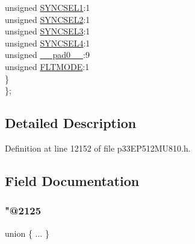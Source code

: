 \begin{DoxyCompactItemize}
\begin{tabbing}
\>\>unsigned \hyperlink{structtag_o_c15_c_o_n2_b_i_t_s_a50e73f95ab1c258ddc64f69c0991deaf}{SYNCSEL1}:1\\
\>\>unsigned \hyperlink{structtag_o_c15_c_o_n2_b_i_t_s_a304907a5d2c4cbf1114a54642a85951e}{SYNCSEL2}:1\\
\>\>unsigned \hyperlink{structtag_o_c15_c_o_n2_b_i_t_s_a6bbd1bd2ead6c9fa713969c6eb0f0c75}{SYNCSEL3}:1\\
\>\>unsigned \hyperlink{structtag_o_c15_c_o_n2_b_i_t_s_a0cd5bbe196c7974953909d27a6307bb7}{SYNCSEL4}:1\\
\>\>unsigned \hyperlink{structtag_o_c15_c_o_n2_b_i_t_s_adf71f3d8410c1f1dbbc96680a92c49af}{\_\_pad0\_\_}:9\\
\>\>unsigned \hyperlink{structtag_o_c15_c_o_n2_b_i_t_s_ad53c2a5303780172219bfd5e0100c782}{FLTMODE}:1\\
\>\} \\
\}; \\

\end{tabbing}\end{DoxyCompactItemize}


\subsection{Detailed Description}


Definition at line 12152 of file p33\+E\+P512\+M\+U810.\+h.



\subsection{Field Documentation}
\mbox{\label{structtag_o_c15_c_o_n2_b_i_t_s_aaa50c3e593ff3a02722e7f16fce5331f}} 
\subsubsection{\texorpdfstring{"@2125}{@2125}}
{\footnotesize\ttfamily union \{ ... \} }

\mbox{\label{structtag_o_c15_c_o_n2_b_i_t_s_adf71f3d8410c1f1dbbc96680a92c49af}} 
